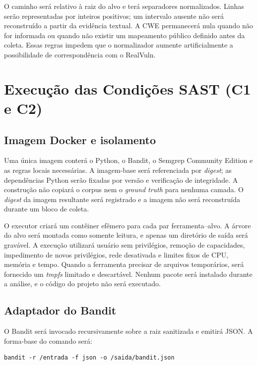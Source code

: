 O caminho será relativo à raiz do alvo e terá separadores normalizados. Linhas serão representadas por inteiros positivos; um intervalo ausente não será reconstruído a partir da evidência textual. A CWE permanecerá nula quando não for informada ou quando não existir um mapeamento público definido antes da coleta. Essas regras impedem que o normalizador aumente artificialmente a possibilidade de correspondência com o RealVuln.

\section{Execução das Condições SAST (C1 e C2)}\label{sec:execucao-sast-desenvolvimento}

\subsection{Imagem Docker e isolamento}\label{subsec:construcao-imagem-docker}

Uma única imagem conterá o Python, o Bandit, o Semgrep Community Edition e as regras locais necessárias. A imagem-base será referenciada por \textit{digest}; as dependências Python serão fixadas por versão e verificação de integridade. A construção não copiará o corpus nem o \textit{ground truth} para nenhuma camada. O \textit{digest} da imagem resultante será registrado e a imagem não será reconstruída durante um bloco de coleta.

O executor criará um contêiner efêmero para cada par ferramenta--alvo. A árvore do alvo será montada como somente leitura, e apenas um diretório de saída será gravável. A execução utilizará usuário sem privilégios, remoção de capacidades, impedimento de novos privilégios, rede desativada e limites fixos de CPU, memória e tempo. Quando a ferramenta precisar de arquivos temporários, será fornecido um \textit{tmpfs} limitado e descartável. Nenhum pacote será instalado durante a análise, e o código do projeto não será executado.

\subsection{Adaptador do Bandit}\label{subsec:execucao-bandit}

O Bandit será invocado recursivamente sobre a raiz sanitizada e emitirá JSON. A forma-base do comando será:

\begin{verbatim}
bandit -r /entrada -f json -o /saida/bandit.json
\end{verbatim}

